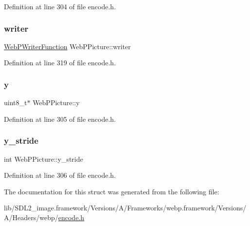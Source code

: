 Definition at line 304 of file encode.\+h.

\mbox{\label{struct_web_p_picture_ae28d9b1c516932e230ec1a031ce368ce}} 
\subsubsection{\texorpdfstring{writer}{writer}}
{\footnotesize\ttfamily \mbox{\hyperlink{encode_8h_a09d500b8d73b44534f63ed6f16a68358}{Web\+P\+Writer\+Function}} Web\+P\+Picture\+::writer}



Definition at line 319 of file encode.\+h.

\mbox{\label{struct_web_p_picture_a2a7d500f47757cd483db60ac35d8a041}} 
\subsubsection{\texorpdfstring{y}{y}}
{\footnotesize\ttfamily uint8\+\_\+t$\ast$ Web\+P\+Picture\+::y}



Definition at line 305 of file encode.\+h.

\mbox{\label{struct_web_p_picture_ae8e016b9af5d8155b16005904f6f5881}} 
\subsubsection{\texorpdfstring{y\_stride}{y\_stride}}
{\footnotesize\ttfamily int Web\+P\+Picture\+::y\+\_\+stride}



Definition at line 306 of file encode.\+h.



The documentation for this struct was generated from the following file\+:\begin{DoxyCompactItemize}
\item 
lib/\+S\+D\+L2\+\_\+image.\+framework/\+Versions/\+A/\+Frameworks/webp.\+framework/\+Versions/\+A/\+Headers/webp/\mbox{\hyperlink{encode_8h}{encode.\+h}}\end{DoxyCompactItemize}
